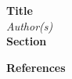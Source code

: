 \documentclass[a4paper, 12pt]{article}
\begin{document}
\noindent\textbf{Title}\\
\emph{Author(s)}\\

\noindent\textbf{Section} 
	
\noindent\textbf{References}
\printbibliography[heading=none]
\end{document}
